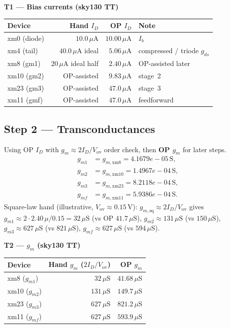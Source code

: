 \documentclass[11pt]{article}
\begin{document}
\textbf{T1 --- Bias currents (sky130 TT)}
\begin{center}
{\small
\begin{tabular}{@{}lrrl@{}}
\toprule
Device & Hand $I_D$ & OP $I_D$ & Note \\
\midrule
xm0 (diode) & $10.0\,\mu\mathrm{A}$ & $10.00\,\mu\mathrm{A}$ & $I_b$ \\
xm4 (tail) & $40.0\,\mu\mathrm{A}$ ideal & $5.06\,\mu\mathrm{A}$ & compressed / triode $g_{ds}$ \\
xm8 (gm1) & $20\,\mu\mathrm{A}$ ideal half & $2.40\,\mu\mathrm{A}$ & OP-assisted later \\
xm10 (gm2) & OP-assisted & $9.83\,\mu\mathrm{A}$ & stage~2 \\
xm23 (gm3) & OP-assisted & $47.0\,\mu\mathrm{A}$ & stage~3 \\
xm11 (gmf) & OP-assisted & $47.0\,\mu\mathrm{A}$ & feedforward \\
\bottomrule
\end{tabular}}
\end{center}

\subsection{Step 2 --- Transconductances}
Using OP $I_D$ with $g_m\approx 2I_D/V_{\mathrm{ov}}$ order check, then \textbf{OP $g_m$} for later steps.
\begin{align*}
g_{m1} &= g_{m,\mathrm{xm8}} = 4.1679e-05\,\mathrm{S},\\
g_{m2} &= g_{m,\mathrm{xm10}} = 1.4967e-04\,\mathrm{S},\\
g_{m3} &= g_{m,\mathrm{xm23}} = 8.2118e-04\,\mathrm{S},\\
g_{mf} &= g_{m,\mathrm{xm11}} = 5.9386e-04\,\mathrm{S}.
\end{align*}
Square-law hand (illustrative, $V_{\mathrm{ov}}{\approx}0.15\,\mathrm{V}$):
$g_{m,\mathrm{sq}}{\approx}2I_D/V_{\mathrm{ov}}$ gives
$g_{m1}{\approx}2\cdot 2.40\,\mu /0.15{=}32\,\mu\mathrm{S}$ (vs OP $41.7\,\mu\mathrm{S}$),
$g_{m2}{\approx}131\,\mu\mathrm{S}$ (vs $150\,\mu\mathrm{S}$),
$g_{m3}{\approx}627\,\mu\mathrm{S}$ (vs $821\,\mu\mathrm{S}$),
$g_{mf}{\approx}627\,\mu\mathrm{S}$ (vs $594\,\mu\mathrm{S}$).

\textbf{T2 --- $g_m$ (sky130 TT)}
\begin{center}
{\small
\begin{tabular}{@{}lrr@{}}
\toprule
Device & Hand $g_m$ ($2I_D/V_{\mathrm{ov}}$) & OP $g_m$ \\
\midrule
xm8 ($g_{m1}$) & $32\,\mu\mathrm{S}$ & $41.68\,\mu\mathrm{S}$ \\
xm10 ($g_{m2}$) & $131\,\mu\mathrm{S}$ & $149.7\,\mu\mathrm{S}$ \\
xm23 ($g_{m3}$) & $627\,\mu\mathrm{S}$ & $821.2\,\mu\mathrm{S}$ \\
xm11 ($g_{mf}$) & $627\,\mu\mathrm{S}$ & $593.9\,\mu\mathrm{S}$ \\
\bottomrule
\end{tabular}}
\end{center}
\end{document}
